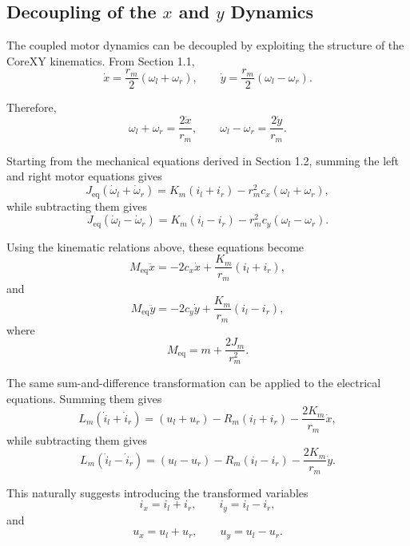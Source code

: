 \documentclass[11pt,a4paper]{article}
\begin{document}
\subsection{Decoupling of the $x$ and $y$ Dynamics}

The coupled motor dynamics can be decoupled by exploiting the structure of
the CoreXY kinematics. From Section 1.1,
\[
\dot{x}=\frac{r_m}{2}\left(\omega_l+\omega_r\right),
\qquad
\dot{y}=\frac{r_m}{2}\left(\omega_l-\omega_r\right).
\]

Therefore,
\[
\omega_l+\omega_r=\frac{2\dot{x}}{r_m},
\qquad
\omega_l-\omega_r=\frac{2\dot{y}}{r_m}.
\]

Starting from the mechanical equations derived in Section 1.2, summing the
left and right motor equations gives
\begin{equation}
J_{\mathrm{eq}}\left(\dot{\omega}_l+\dot{\omega}_r\right)
=
K_m(i_l+i_r)
-r_m^2c_x(\omega_l+\omega_r),
\end{equation}
while subtracting them gives
\begin{equation}
J_{\mathrm{eq}}\left(\dot{\omega}_l-\dot{\omega}_r\right)
=
K_m(i_l-i_r)
-r_m^2c_y(\omega_l-\omega_r).
\end{equation}

Using the kinematic relations above, these equations become
\begin{equation}
M_{\mathrm{eq}}\ddot{x}
=
-2c_x\dot{x}
+
\frac{K_m}{r_m}(i_l+i_r),
\end{equation}
and
\begin{equation}
M_{\mathrm{eq}}\ddot{y}
=
-2c_y\dot{y}
+
\frac{K_m}{r_m}(i_l-i_r),
\end{equation}
where
\begin{equation}
M_{\mathrm{eq}}
=
m+\frac{2J_m}{r_m^2}.
\end{equation}

The same sum-and-difference transformation can be applied to the electrical
equations. Summing them gives
\begin{equation}
L_m(\dot{i}_l+\dot{i}_r)
=
(u_l+u_r)
-R_m(i_l+i_r)
-\frac{2K_m}{r_m}\dot{x},
\end{equation}
while subtracting them gives
\begin{equation}
L_m(\dot{i}_l-\dot{i}_r)
=
(u_l-u_r)
-R_m(i_l-i_r)
-\frac{2K_m}{r_m}\dot{y}.
\end{equation}

This naturally suggests introducing the transformed variables
\begin{equation}
i_x=i_l+i_r,
\qquad
i_y=i_l-i_r,
\end{equation}
and
\begin{equation}
u_x=u_l+u_r,
\qquad
u_y=u_l-u_r.
\end{equation}
\end{document}
